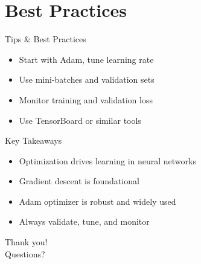 \documentclass{beamer}
\begin{document}
\section{Best Practices}
\begin{frame}{Tips \& Best Practices}
\begin{itemize}
    \item Start with Adam, tune learning rate
    \item Use mini-batches and validation sets
    \item Monitor training and validation loss
    \item Use TensorBoard or similar tools
\end{itemize}
\end{frame}

\begin{frame}{Key Takeaways}
\begin{itemize}
    \item Optimization drives learning in neural networks
    \item Gradient descent is foundational
    \item Adam optimizer is robust and widely used
    \item Always validate, tune, and monitor
\end{itemize}
\end{frame}

\begin{frame}[standout]
    Thank you! \\
    Questions?
\end{frame}
\end{document}
